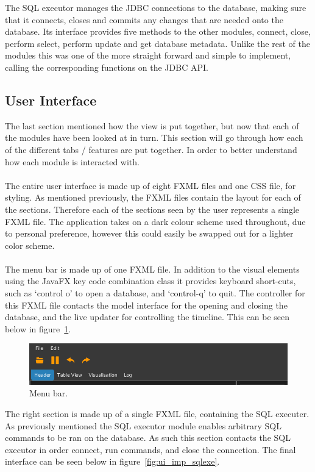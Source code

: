 The SQL executor manages the JDBC connections to the database, making sure that it connects, closes and commits any changes that are needed onto the database. Its interface provides five methods to the other modules, connect, close, perform select, perform update and get database metadata. Unlike the rest of the modules this was one of the more straight forward and simple to implement, calling the corresponding functions on the JDBC API.

\subsection{User Interface}
\label{subsec:user_interface_imp}

The last section mentioned how the view is put together, but now that each of the modules have been looked at in turn. This section will go through how each of the different tabs / features are put together. In order to better understand how each module is interacted with.
\\\\
The entire user interface is made up of eight FXML files and one CSS file, for styling. As mentioned previously, the FXML files contain the layout for each of the sections. Therefore  each of the sections seen by the user represents a single FXML file. The application takes on a dark colour scheme used throughout, due to personal preference, however this could easily be swapped out for a lighter color scheme. 
\\\\
The menu bar is made up of one FXML file. In addition to the visual elements using the JavaFX key code combination class it provides keyboard short-cuts, such as `control o' to open a database, and `control-q' to quit. The controller for this FXML file  contacts the model interface for the opening and closing the database, and the live updater for controlling the timeline.  This can be seen below in figure~\ref{fig:ui_screen}.

\begin{figure}[H]
	\centering
	\includegraphics[scale=0.32]{images/ui_screen.png}
	\caption{Menu bar.}
	\label{fig:ui_screen}
\end{figure}

The right section is made up of a single FXML file, containing the SQL executer. As previously mentioned the SQL executor module enables arbitrary SQL commands to be ran on the database. As such this section contacts the SQL executor in order connect, run commands, and close the connection. The final interface can be seen below in figure~\ref{fig:ui_imp_sqlexe}.

